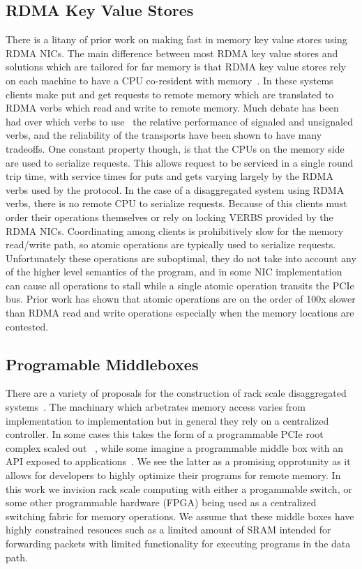 \subsection{RDMA Key Value Stores}

There is a litany of prior work on making fast in memory key value stores using
RDMA NICs. The main difference between most RDMA key value stores and solutions
which are tailored for far memory is that RDMA key value stores rely on each
machine to have a CPU co-resident with memory~\cite{herd,pilaf,storm,soNUMA,
MemC3, ect}. In these systems clients make put and get requests to remote memory
which are translated to RDMA verbs which read and write to remote memory. Much
debate has been had over which verbs to use~\cite{storm, herd, eRPC} the
relative performance of signaled and unsignaled verbs, and the reliability of
the transports have been shown to have many tradeoffs. One constant property
though, is that the CPUs on the memory side are used to serialize requests. This
allows request to be serviced in a single round trip time, with service times
for puts and gets varying largely by the RDMA verbs used by the protocol. In the
case of a disaggregated system using RDMA verbs, there is no remote CPU to
serialize requests. Because of this clients must order their operations
themselves or rely on locking VERBS provided by the RDMA NICs. Coordinating
among clients is prohibitively slow for the memory read/write path, so atomic
operations are typically used to serialize requests. Unfortunately these
operations are suboptimal, they do not take into account any of the higher level
semantics of the program, and in some NIC implementation can cause all operations
to stall while a single atomic operation transits the PCIe bus. Prior work has
shown that atomic operations are on the order of 100x slower than RDMA read and
write operations especially when the memory locations are contested.

\subsection{Programable Middleboxes}

There are a variety of proposals for the construction of rack scale
disaggregated systems~\cite{firebox, themachine, disaggregation and the
application, ect}. The machinary which arbetrates memory access varies from
implementation to implementation but in general they rely on a centralized
controller. In some cases this takes the form of a programmable PCIe root
complex scaled out ~\cite{cant remember}, while some imagine a programmable
middle box with an API exposed to applications~\cite{dissagregation and the
application}. We see the latter as a promising opprotunity as it allows for
developers to highly optimize their programs for remote memory. In this work we
invision rack scale computing with either a progammable switch, or some other
programmable hardware (FPGA) being used as a centralized switching fabric for
memory operations. We assume that these middle boxes have highly constrained
resouces such as a limited amount of SRAM intended for forwarding packets with
limited functionality for executing programs in the data path.

